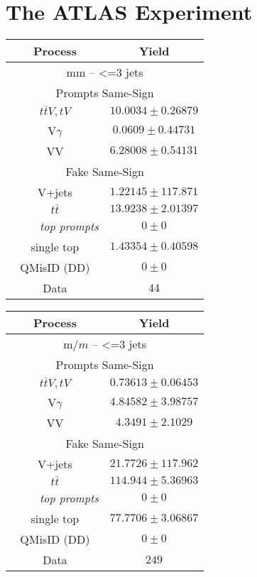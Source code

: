 \chapter[The ATLAS Experiment][The ATLAS Experiment]{The ATLAS Experiment}


\begin{tabular}{|c|c|}
\hline 
Process & Yield \\ 
\hline
\multicolumn{2}{|c|}{ mm -- <=3 jets } \\ 
\hline
\multicolumn{2}{|c|}{Prompts Same-Sign} \\ 
 $t\bar{t}V, tV$ & $ 10.0034 \pm 0.26879$ \\ 
 V$\gamma$ & $0.0609 \pm 0.44731$ \\ 
 VV & $6.28008 \pm 0.54131$ \\ 
\hline 
\multicolumn{2}{|c|}{Fake Same-Sign} \\ 
 V+jets & $1.22145 \pm 117.871$ \\ 
$t\bar{t}$ & $13.9238 \pm 2.01397$ \\ 
 ~ ~ ~ {\it top prompts} & $    0 \pm     0$ \\ 
  single top & $1.43354 \pm 0.40598$ \\ 
  \hline 
 QMisID (DD) & $    0 \pm     0$ \\ 
 \hline 
 Data & $   44$ \\ 
 \hline\hline 
 \end{tabular}


\begin{tabular}{|c|c|}\hline Process & Yield \\ \hline
\multicolumn{2}{|c|}{ m$\slash{m}$ -- <=3 jets } \\ \hline
\multicolumn{2}{|c|}{Prompts Same-Sign} \\ 
 $t\bar{t}V, tV$ & $ 0.73613 \pm 0.06453$ \\ 
 V$\gamma$ & $4.84582 \pm 3.98757$ \\ 
 VV & $4.3491 \pm 2.1029$ \\ \hline 
\multicolumn{2}{|c|}{Fake Same-Sign} \\ 
 V+jets & $21.7726 \pm 117.962$ \\ 
$t\bar{t}$ & $114.944 \pm 5.36963$ \\ 
 ~ ~ ~ {\it top prompts} & $    0 \pm     0$ \\ 
  single top & $77.7706 \pm 3.06867$ \\ \hline 
 QMisID (DD) & $    0 \pm     0$ \\ \hline 
 Data & $  249$ \\ \hline\hline \end{tabular}



